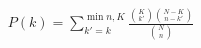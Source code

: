  

\begin{gather} \label{eq:cumulative-hypergeometric}
 P(k) = \sum_{ k' = k }^{\min{n,K}} \frac{ \binom{K}{k'} \binom{N-K}{n-k'}}{\binom{N}{n}}
\end{gather}
